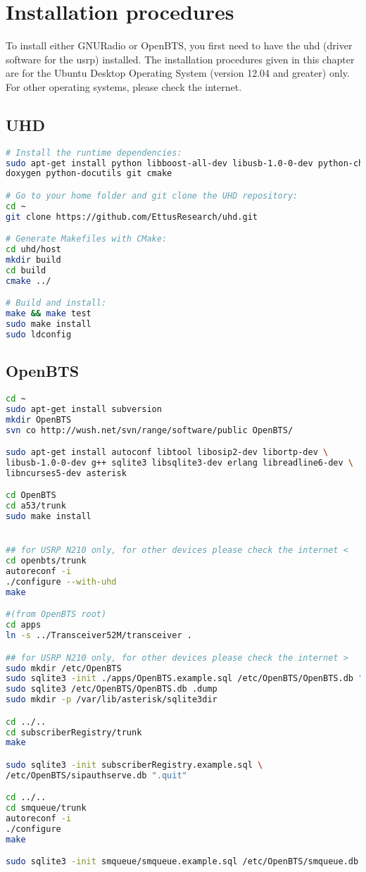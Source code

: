 \chapter{Installation procedures}
To install either GNURadio or OpenBTS, you first need to have the \gls{uhd} (driver
software for the \gls{usrp}) installed. The installation procedures given in this 
chapter are for the Ubuntu Desktop Operating System (version 12.04 and
greater) only. For other operating systems, please check the internet.
\section{UHD}
\begin{lstlisting}[language=bash]
# Install the runtime dependencies:
sudo apt-get install python libboost-all-dev libusb-1.0-0-dev python-cheetah \
doxygen python-docutils git cmake

# Go to your home folder and git clone the UHD repository:
cd ~
git clone https://github.com/EttusResearch/uhd.git

# Generate Makefiles with CMake:
cd uhd/host
mkdir build
cd build
cmake ../

# Build and install:
make && make test
sudo make install
sudo ldconfig
\end{lstlisting}


\section{OpenBTS}

\begin{lstlisting}[language=bash]
cd ~
sudo apt-get install subversion
mkdir OpenBTS
svn co http://wush.net/svn/range/software/public OpenBTS/

sudo apt-get install autoconf libtool libosip2-dev libortp-dev \
libusb-1.0-0-dev g++ sqlite3 libsqlite3-dev erlang libreadline6-dev \
libncurses5-dev asterisk

cd OpenBTS
cd a53/trunk
sudo make install


## for USRP N210 only, for other devices please check the internet <
cd openbts/trunk
autoreconf -i
./configure --with-uhd
make

#(from OpenBTS root)
cd apps
ln -s ../Transceiver52M/transceiver .

## for USRP N210 only, for other devices please check the internet >
sudo mkdir /etc/OpenBTS
sudo sqlite3 -init ./apps/OpenBTS.example.sql /etc/OpenBTS/OpenBTS.db ".quit"
sudo sqlite3 /etc/OpenBTS/OpenBTS.db .dump
sudo mkdir -p /var/lib/asterisk/sqlite3dir

cd ../..
cd subscriberRegistry/trunk
make

sudo sqlite3 -init subscriberRegistry.example.sql \
/etc/OpenBTS/sipauthserve.db ".quit"

cd ../..
cd smqueue/trunk
autoreconf -i
./configure
make

sudo sqlite3 -init smqueue/smqueue.example.sql /etc/OpenBTS/smqueue.db ".quit"
\end{lstlisting}


